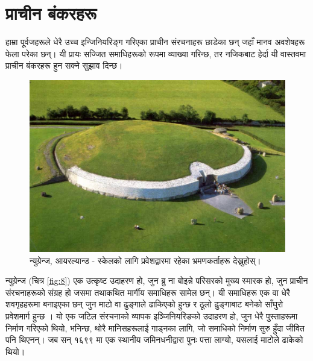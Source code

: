 \documentclass[10pt,twocolumn,letterpaper]{article}
\begin{document}
\section{प्राचीन बंकरहरू}

हाम्रा पूर्वजहरूले धेरै उच्च इन्जिनियरिङ्ग गरिएका प्राचीन संरचनाहरू छाडेका छन् जहाँ मानव अवशेषहरू फेला परेका छन्। यी प्रायः सज्जित समाधिहरूको रूपमा व्याख्या गरिन्छ, तर नजिकबाट हेर्दा यी वास्तवमा प्राचीन बंकरहरू हुन सक्ने सुझाव दिन्छ।

\begin{figure}[b]
\begin{center}
   \includegraphics[width=1\linewidth]{ww19.jpg}
\end{center}
   \caption{न्युग्रेन्ज, आयरल्यान्ड - स्केलको लागि प्रवेशद्वारमा रहेका भ्रमणकर्ताहरू देख्नुहोस्।}
\label{fig:8}
\label{fig:onecol}
\end{figure}

न्युग्रेन्ज (चित्र \ref{fig:8}) एक उत्कृष्ट उदाहरण हो, जुन ब्रु ना बोइन्ने परिसरको मुख्य स्मारक हो, जुन प्राचीन संरचनाहरूको संग्रह हो जसमा तथाकथित मार्गीय समाधिहरू सामेल छन्। यी समाधिहरू एक वा धेरै शवगृहहरूमा बनाइएका छन् जुन माटो वा ढुङ्गाले ढाकिएको हुन्छ र ठूलो ढुङ्गाबाट बनेको साँघुरो प्रवेशमार्ग हुन्छ \cite{70}। यो एक जटिल संरचनाको व्यापक इञ्जिनियरिङको उदाहरण हो, जुन धेरै पुस्ताहरूमा निर्माण गरिएको थियो, भनिन्छ, थोरै मानिसहरूलाई गाड्नका लागि, जो समाधिको निर्माण सुरु हुँदा जीवित पनि थिएनन्। जब सन् १६९९ मा एक स्थानीय जमिनधनीद्वारा पुनः पत्ता लाग्यो, यसलाई माटोले ढाकेको थियो।
\end{document}
